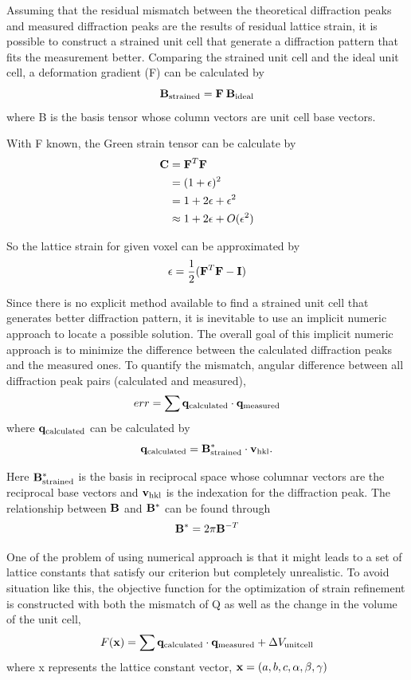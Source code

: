 \documentclass[12pt]{scrartcl}
\begin{document}
\begin{enumerate}
Assuming that the residual mismatch between the theoretical diffraction peaks and measured diffraction peaks are the results of residual lattice strain, it is possible to construct a strained unit cell that generate a diffraction pattern that fits the measurement better.
Comparing the strained unit cell and the ideal unit cell, a deformation gradient (\tnsr F) can be calculated by
\[
	\mathbf{B}_\text{strained} = \mathbf{F} \: \mathbf{B}_\text{ideal}
\]
where \tnsr B is the basis tensor whose column vectors are unit cell base vectors.

With \tnsr F known, the Green strain tensor can be calculate by
\begin{align*}
	\mathbf{C} &= \mathbf{F}^T \mathbf{F} \\
	            &= (1 + \mathbf{\epsilon})^2 \\
	            &= 1 + 2\epsilon + \epsilon^2 \\
	            &\approx 1 + 2\epsilon + O(\epsilon^2)
\end{align*}

So the lattice strain for given voxel can be approximated by
\[
	\epsilon = \dfrac{1}{2} (\mathbf{F}^T\mathbf{F} - \mathbf{I})
\]

Since there is no explicit method available to find a strained unit cell that generates better diffraction pattern, it is inevitable to use an implicit numeric approach to locate a possible solution.
The overall goal of this implicit numeric approach is to minimize the difference between the calculated diffraction peaks and the measured ones.
To quantify the mismatch, angular difference between all diffraction peak pairs (calculated and measured),
\[
	err = \sum \mathbf{q}_\text{calculated} \cdot \mathbf{q}_\text{measured}
\]
where $\mathbf{q}_\text{calculated}$ can be calculated by
\[
	\mathbf{q}_\text{calculated} = \mathbf{B}^*_\text{strained} \cdot \mathbf{v}_\text{hkl}.
\]

Here $\mathbf{B}^*_\text{strained}$ is the basis in reciprocal space whose columnar vectors are the reciprocal base vectors and $\mathbf{v}_\text{hkl}$ is the indexation for the diffraction peak.
The relationship between $\mathbf{B}$ and $\mathbf{B}^*$ can be found through
\[
	\mathbf{B}^* = 2 \pi \mathbf{B}^{-T}
\]

One of the problem of using numerical approach is that it might leads to a set of lattice constants that satisfy our criterion but completely unrealistic. 
To avoid situation like this, the objective function for the optimization of strain refinement is constructed with both the mismatch of \tnsr Q as well as the change in the volume of the unit cell, 
\[
	F(\mathbf{x}) = \sum \mathbf{q}_\text{calculated} \cdot \mathbf{q}_\text{measured} + \Delta V_\text{unitcell}
\]
where \tnsr x represents the lattice constant vector, $\mathbf{x} = (a,b,c,\alpha,\beta,\gamma)$


\end{enumerate}
\end{document}
